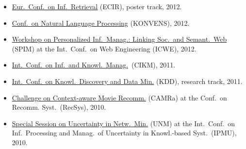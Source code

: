 \documentclass[line,mm]{res}
\newcounter{x}
\newcounter{y}
\begin{document}
\begin{resume}
\begin{itemize}
{  Anal.\ and Tools for Online Community Manag.}\ (MAMA), at
  INFORMATIK, 2013
\item \href{http://ecir2012.upf.edu/}{Eur.\ Conf.\ on Inf.\ Retrieval} (ECIR), poster track, 2012.  
\item \href{http://www.oegai.at/konvens2012/}{Conf.\ on Natural Language
  Processing} (KONVENS), 2012. 
\item \href{http://spim-workshop.org/}{Workshop on Personalized
  Inf.\ Manag.: Linking Soc.\ and Semant.\ Web} (SPIM) at the
  Int.\ Conf.\ on Web Engineering (ICWE), 2012. 
\item \href{http://www.cikm2011.org/}{Int.\ Conf.\ on Inf.\ and Knowl.\ Manag.}\ (CIKM), 2011.
\item \href{http://www.sigkdd.org/kdd/2011/}{Int.\ Conf.\ on 
  Knowl.\ Discovery and Data Min.} (KDD), research track, 2011.
\item \href{http://www.dai-labor.de/camra2010/}{Challenge on
  Context-aware Movie Recomm.} (CAMRa) at the Conf.\ on  
  Recomm. Syst.\ (RecSys), 2010.   
\item \href{http://www.dai-labor.de/unm2010/}{Special Session on Uncertainty in Netw.\ Min.} (UNM) at the
  Int.\ Conf.\ on Inf.\ Processing and Manag.\ of
  Uncertainty in Knowl.-based Syst.\ (IPMU), 2010. 
\end{itemize}


\end{resume}
\end{document}
